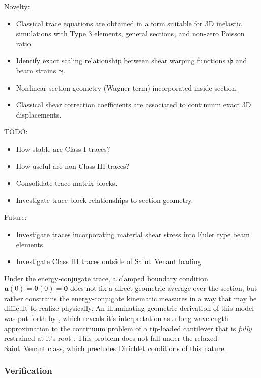 Novelty:
\begin{itemize}
    \item Classical trace equations are obtained in a form suitable for 3D inelastic simulations with Type 3 elements, general sections, and non-zero Poisson ratio. 
    \item Identify exact scaling relationship between shear warping functions \(\bm{\psi}\) and beam strains \(\bm\gamma\).
    \item Nonlinear section geometry (Wagner term) incorporated inside section.
    \item Classical shear correction coefficients are associated to continuum exact 3D displacements.
\end{itemize}


TODO:
\begin{itemize}
    \item How stable are Class I traces?
    \item How useful are non-Class III traces?
    \item Consolidate trace matrix blocks.
    \item Investigate trace block relationships to section geometry.
\end{itemize}

Future:
\begin{itemize}
    \item Investigate traces incorporating material shear stress into Euler type beam elements.
    \item Investigate Class III traces outside of Saint~Venant loading.
\end{itemize}


Under the energy-conjugate trace, a clamped boundary condition 
$\bm{u}(0) = \bm{\theta}(0) = \mathbf{0}$ does not fix a direct geometric average over the section, but rather constrains the energy-conjugate kinematic measures in a way that may be difficult to realize physically. 
An illuminating geometric derivation of this model was put forth by \cite{serpieri2014equivalence}, which reveals it's interpretation as a long-wavelength approximation to the continuum problem of a tip-loaded cantilever that is \emph{fully} restrained at it's root \cite{ladeveze1998new}. 
This problem does not fall under the relaxed Saint~Venant class, which precludes Dirichlet conditions of this nature. 


\subsubsection{Verification}

